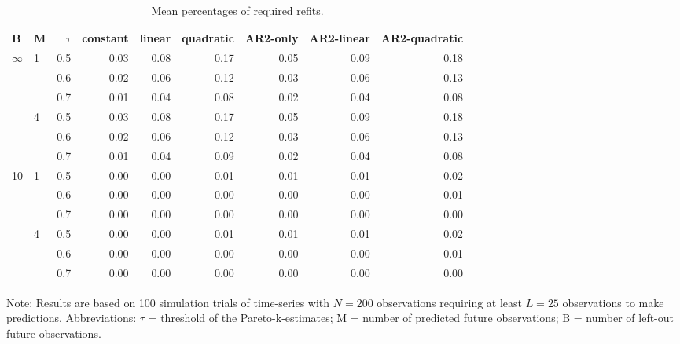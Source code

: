 \documentclass[american,]{article}
\begin{document}
\begin{table}[t]

\caption{\label{tab:refits}Mean percentages of required refits.}
\centering
\begin{threeparttable}
\begin{tabular}{llrrrrrrr}
\toprule
B & M & $\tau$ & constant & linear & quadratic & AR2-only & AR2-linear & AR2-quadratic\\
\midrule
$\infty$ & 1 & 0.5 & 0.03 & 0.08 & 0.17 & 0.05 & 0.09 & 0.18\\
 &  & 0.6 & 0.02 & 0.06 & 0.12 & 0.03 & 0.06 & 0.13\\
 &  & 0.7 & 0.01 & 0.04 & 0.08 & 0.02 & 0.04 & 0.08\\
 & 4 & 0.5 & 0.03 & 0.08 & 0.17 & 0.05 & 0.09 & 0.18\\
 &  & 0.6 & 0.02 & 0.06 & 0.12 & 0.03 & 0.06 & 0.13\\
\addlinespace
 &  & 0.7 & 0.01 & 0.04 & 0.09 & 0.02 & 0.04 & 0.08\\
10 & 1 & 0.5 & 0.00 & 0.00 & 0.01 & 0.01 & 0.01 & 0.02\\
 &  & 0.6 & 0.00 & 0.00 & 0.00 & 0.00 & 0.00 & 0.01\\
 &  & 0.7 & 0.00 & 0.00 & 0.00 & 0.00 & 0.00 & 0.00\\
 & 4 & 0.5 & 0.00 & 0.00 & 0.01 & 0.01 & 0.01 & 0.02\\
\addlinespace
 &  & 0.6 & 0.00 & 0.00 & 0.00 & 0.00 & 0.00 & 0.01\\
 &  & 0.7 & 0.00 & 0.00 & 0.00 & 0.00 & 0.00 & 0.00\\
\bottomrule
\end{tabular}
\begin{tablenotes}
\item Note: Results are based on 100 simulation trials of time-series with $N = 200$ observations requiring at least $L = 25$ observations to make predictions. Abbreviations: $\tau$ = threshold of the Pareto-k-estimates; M = number of predicted future observations; B = number of left-out future observations.
\end{tablenotes}
\end{threeparttable}
\end{table}
\end{document}
